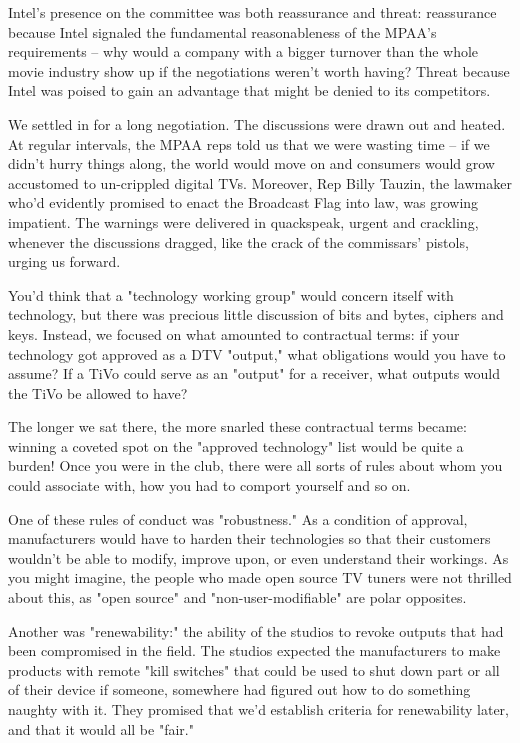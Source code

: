 Intel's presence on the committee was both reassurance and threat:
reassurance because Intel signaled the fundamental reasonableness
of the MPAA's requirements -- why would a company with a bigger
turnover than the whole movie industry show up if the negotiations
weren't worth having? Threat because Intel was poised to gain an
advantage that might be denied to its competitors.

We settled in for a long negotiation. The discussions were drawn
out and heated. At regular intervals, the MPAA reps told us that we
were wasting time -- if we didn't hurry things along, the world
would move on and consumers would grow accustomed to un-crippled
digital TVs. Moreover, Rep Billy Tauzin, the lawmaker who'd
evidently promised to enact the Broadcast Flag into law, was
growing impatient. The warnings were delivered in quackspeak,
urgent and crackling, whenever the discussions dragged, like the
crack of the commissars' pistols, urging us forward.

You'd think that a "technology working group" would concern itself
with technology, but there was precious little discussion of bits
and bytes, ciphers and keys. Instead, we focused on what amounted
to contractual terms: if your technology got approved as a DTV
"output," what obligations would you have to assume? If a TiVo
could serve as an "output" for a receiver, what outputs would the
TiVo be allowed to have?

The longer we sat there, the more snarled these contractual terms
became: winning a coveted spot on the "approved technology" list
would be quite a burden! Once you were in the club, there were all
sorts of rules about whom you could associate with, how you had to
comport yourself and so on.

One of these rules of conduct was "robustness." As a condition of
approval, manufacturers would have to harden their technologies so
that their customers wouldn't be able to modify, improve upon, or
even understand their workings. As you might imagine, the people
who made open source TV tuners were not thrilled about this, as
"open source" and "non-user-modifiable" are polar opposites.

Another was "renewability:" the ability of the studios to revoke
outputs that had been compromised in the field. The studios
expected the manufacturers to make products with remote "kill
switches" that could be used to shut down part or all of their
device if someone, somewhere had figured out how to do something
naughty with it. They promised that we'd establish criteria for
renewability later, and that it would all be "fair."

